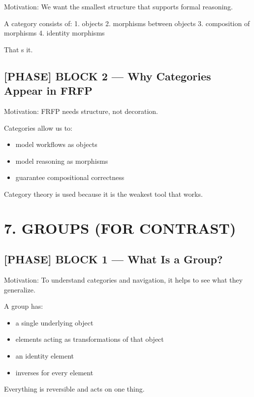 Motivation: We want the smallest structure that supports formal reasoning.\par

A category consists of: 1. objects 2. morphisms between objects 3. composition of morphisms 4. identity morphisms\par

That s it.\par

\subsection*{[PHASE] BLOCK 2 --- Why Categories Appear in FRFP}

Motivation: FRFP needs structure, not decoration.\par

Categories allow us to:\n\n\begin{itemize}\n\item model workflows as objects
\item model reasoning as morphisms
\item guarantee compositional correctness\n\end{itemize}

 Category theory is used because it is the weakest tool that works.\par

\section*{7. GROUPS (FOR CONTRAST)}

\subsection*{[PHASE] BLOCK 1 --- What Is a Group?}

Motivation: To understand categories and navigation, it helps to see what they generalize.\par

A group has:\n\n\begin{itemize}\n\item a single underlying object
\item elements acting as transformations of that object
\item an identity element
\item inverses for every element\n\end{itemize}

Everything is reversible and acts on one thing.\par

